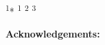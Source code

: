 \abstract
{} 
{} 
{\textsuperscript{1}*} 
{\KLtag} 
{
\textsuperscript{1}
\textsuperscript{2}
\textsuperscript{3}
}
{}  %
{}
{

\vspace{0.5em}
\noindent
\textbf{Acknowledgements:}
\textit{}
}
{
}
